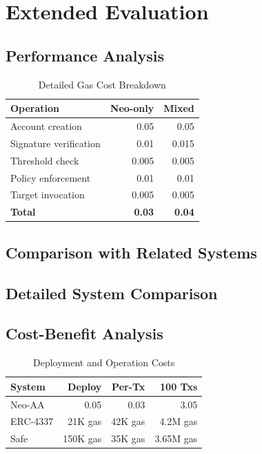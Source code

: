 \documentclass[10pt,twocolumn]{article}
\begin{document}
\section{Extended Evaluation}

\subsection{Performance Analysis}

\begin{table}[h]
\centering
\caption{Detailed Gas Cost Breakdown}
\begin{tabular}{@{}lrr@{}}
\toprule
Operation & Neo-only & Mixed \\\midrule
Account creation & 0.05 & 0.05 \\
Signature verification & 0.01 & 0.015 \\
Threshold check & 0.005 & 0.005 \\
Policy enforcement & 0.01 & 0.01 \\
Target invocation & 0.005 & 0.005 \\
\textbf{Total} & \textbf{0.03} & \textbf{0.04} \\
\bottomrule
\end{tabular}
\end{table}

\subsection{Comparison with Related Systems}

\subsection{Detailed System Comparison}

\subsection{Cost-Benefit Analysis}

\begin{table}[h]
\centering
\caption{Deployment and Operation Costs}
\begin{tabular}{@{}lrrr@{}}
\toprule
System & Deploy & Per-Tx & 100 Txs \\\midrule
Neo-AA & 0.05 & 0.03 & 3.05 \\
ERC-4337 & 21K gas & 42K gas & 4.2M gas \\
Safe & 150K gas & 35K gas & 3.65M gas \\
\bottomrule
\end{tabular}
\end{table}
\end{document}
